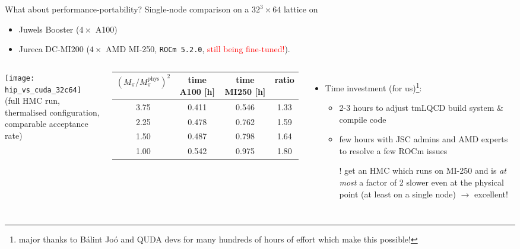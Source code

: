\documentclass[xcolor={dvipsnames,table}]{beamer}
\begin{document}
{
\begin{frame}{What about performance-portability?}
  Single-node comparison on a $32^3 \times 64$ lattice on
  \begin{itemize}
    \item Juwels Booster ($4 \times$ A100)
    \item Jureca DC-MI200 ($4 \times$ AMD MI-250, \texttt{ROCm 5.2.0}, \textcolor{red}{still being fine-tuned!}).
  \end{itemize}
  \vspace{0.2cm}

  \begin{columns}
      \centering
      \texttt{[image: hip\_vs\_cuda\_32c64]} \\
      (full HMC run, thermalised configuration, comparable acceptance rate)
      \begin{tabular}{cccc}
        $(M_\pi / M_\pi^{\mathrm{phys}})^2$ & \cellcolor{green!50} time A100 [h] & \cellcolor{red!35}time MI250 [h] & ratio \\
        \hline \hline 
        3.75                                & 0.411         & 0.546          & 1.33 \\
        2.25                                & 0.478         & 0.762          & 1.59 \\
        1.50                                & 0.487         & 0.798          & 1.64 \\
        1.00                                & 0.542         & 0.975          & 1.80
      \end{tabular}
      \vspace{0.2cm}
      \begin{itemize}
        \item Time investment (for us)\footnote{major thanks to B{\'a}lint Jo{\'o} and QUDA devs for many hundreds of hours of effort which make this possible!}: 
        \begin{itemize}
          \item 2-3 hours to adjust tmLQCD build system \& compile code
          \item few hours with JSC admins and AMD experts to resolve a few ROCm issues
          \vspace{0.2cm}
          \item[!] get an HMC which runs on MI-250 and is \textit{at most} a factor of 2 slower even at the physical point (at least on a single node) $\rightarrow$ excellent!
        \end{itemize}
      \end{itemize}
  \end{columns}
\end{frame}

}
\end{document}
